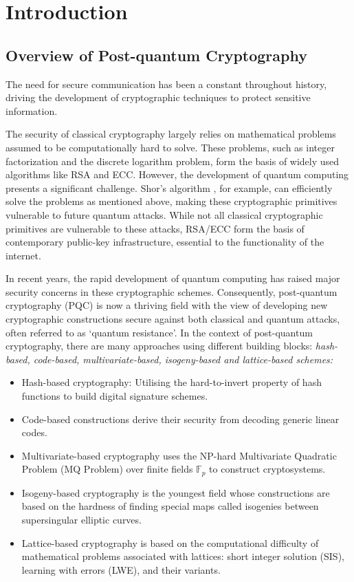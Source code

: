 \documentclass[cryptography,review,submit,pdftex,moreauthors,amsmath,amssymb,aps,strict]{Definitions/mdpi}
\begin{document}
\section{Introduction} \label{introduction}
\subsection{Overview of Post-quantum Cryptography}

The need for secure communication has been a constant throughout history, driving the development of cryptographic techniques to protect sensitive information. 

The security of classical cryptography largely relies on mathematical problems assumed to be computationally hard to solve. These problems, such as integer factorization and the discrete logarithm problem, form the basis of widely used algorithms like RSA and ECC. However, the development of quantum computing presents a significant challenge. Shor's algorithm \cite{Shor94}, for example, can efficiently solve the problems as mentioned above, making these cryptographic primitives vulnerable to future quantum attacks. While not all classical cryptographic primitives are vulnerable to these attacks, RSA/ECC form the basis of contemporary public-key infrastructure, essential to the functionality of the internet.

In recent years, the rapid development of quantum computing has raised major security concerns in these cryptographic schemes. Consequently, post-quantum cryptography (PQC) is now a thriving field with the view of developing new cryptographic constructions secure against both classical and quantum attacks, often referred to as `quantum resistance'. In the context of post-quantum cryptography, there are many approaches using different building blocks: \textit{hash-based, code-based, multivariate-based, isogeny-based and lattice-based schemes:}
\begin{itemize}
    \item Hash-based cryptography: Utilising the hard-to-invert property of hash functions to build digital signature schemes.
    \item Code-based constructions derive their security from decoding generic linear codes.
    \item Multivariate-based cryptography uses the NP-hard Multivariate Quadratic Problem (MQ Problem) over finite fields $\mathbb{F}_p$ to construct cryptosystems.
    \item Isogeny-based cryptography is the youngest field whose constructions are based on the hardness of finding special maps called isogenies between supersingular elliptic curves.
    \item Lattice-based cryptography is based on the computational difficulty of mathematical problems associated with lattices: short integer solution (SIS), learning with errors (LWE), and their variants.
\end{itemize}
\end{document}
